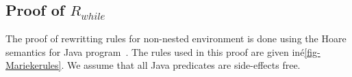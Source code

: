 








\subsection{Proof of $R_{while}$}
\label{sec-while}

The proof of rewritting rules for non-nested 
environment is done using the Hoare semantics 
for Java program~\cite{TheseMarieke}. The rules
used in this proof are given iné\ref{fig-Mariekerules}. 
We assume that all Java predicates are side-effects free.

